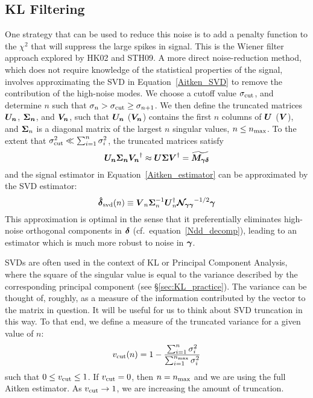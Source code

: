 \subsection{KL Filtering}
\label{sing_val_formalism}
One strategy that can be used to reduce this noise is to add a penalty function
to the $\chi^2$ that will suppress the large spikes in signal.  This
is the Wiener filter approach explored by HK02 and STH09.
A more direct noise-reduction method, which does not require knowledge 
of the statistical properties of the signal, involves approximating 
the SVD in Equation~\ref{Aitken_SVD} to remove the contribution of the 
high-noise modes. We choose a cutoff value
$\sigma_{\rm cut}$, and determine $n$ such that 
$\sigma_n > \sigma_{\rm cut} \ge \sigma_{n+1}$.
We then define the truncated matrices 
$\boldsymbol{U_n}$, $\boldsymbol{\Sigma_n}$, and $\boldsymbol{V_n}$,
such that $\boldsymbol{U_n}$ ($\boldsymbol{V_n}$) contains the first $n$ columns of 
$\boldsymbol{U}$ ($\boldsymbol{V}$),
and $\boldsymbol{\Sigma}_n$ is a diagonal matrix of the largest $n$ singular 
values, $n \le n_{\rm max}$.
To the extent that $\sigma_{\rm cut}^2 \ll \sum_{i=1}^n\sigma_i^2$, 
the truncated matrices satisfy
\begin{equation}
  \boldsymbol{U_n}\boldsymbol{\Sigma_n}\boldsymbol{V_n}^\dagger \approx 
  \boldsymbol{U}\boldsymbol{\Sigma}\boldsymbol{V}^\dagger = \boldsymbol{\widetilde{M_{\gamma\delta}}}
\end{equation}
and the signal estimator in Equation~\ref{Aitken_estimator} can be approximated
by the SVD estimator:
\begin{equation}
  \label{SVD_estimator}
  \boldsymbol{\hat{\delta}}_{\rm svd}(n) \equiv 
  \boldsymbol{V}_n \boldsymbol{\Sigma}_n^{-1} 
  \boldsymbol{U}_n^\dagger \boldsymbol{\mathcal{N}_{\gamma\gamma}}^{-1/2} \boldsymbol{\gamma}
\end{equation}
This approximation is optimal in the sense that it preferentially
eliminates high-noise orthogonal components in $\boldsymbol{\delta}$ 
(cf.\ equation~\ref{Ndd_decomp}), leading to an estimator which is much
more robust to noise in $\boldsymbol{\gamma}$.

SVDs are often used in the context of KL or Principal Component Analysis, 
where the square of the singular value is equal to the variance described 
by the corresponding principal component (see
\S\ref{sec:KL_practice}).  The variance can be
thought of, roughly, as a measure of the information contributed by the
vector to the matrix in question.  It will be useful for
us to think about SVD truncation in this way.  To that end, 
we define a measure of the truncated variance for a given value of $n$:
\begin{equation}
  \label{v_cut}
  v_{\rm cut}(n) = 1 - \frac{\sum_{i=1}^n\sigma_i^2}
  {\sum_{i=1}^{n_{\rm max}}\sigma_i^2}
\end{equation}
such that $0\le v_{\rm cut}\le 1$.  If $v_{\rm cut} = 0$, then $n = n_{\rm max}$ and we are 
using the full Aitken estimator.  As $v_{\rm cut} \rightarrow 1$, we are increasing the amount
of truncation.

